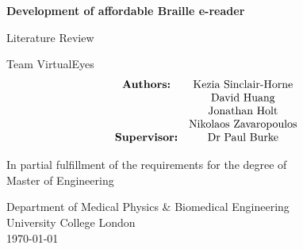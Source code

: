 \begin{titlepage}
    \begin{center}
        \vspace*{1cm}
            
        \huge
        \textbf{Development of affordable Braille e-reader}
            
        \vspace{0.5cm}
        \Large
        Literature Review

        \vspace{1.5cm}
        Team VirtualEyes
        \begin{align*}
            \begin{matrix}
                \text{\textbf{Authors:}} & \text{Kezia Sinclair-Horne} \\     
                                         & \text{David Huang} \\
                                         & \text{Jonathan Holt} \\
                                         & \text{Nikolaos Zavaropoulos} \\
                \textbf{Supervisor:} & \text{Dr Paul Burke} \\
            \end{matrix} \end{align*}

            
        \vfill
            
        In partial fulfillment of the requirements for the degree of \\
        Master of Engineering
            
        \vspace{0.8cm}
            
        \large
        Department of Medical Physics \& Biomedical Engineering\\
        University College London\\
        \today \\
            
    \end{center}
\end{titlepage}